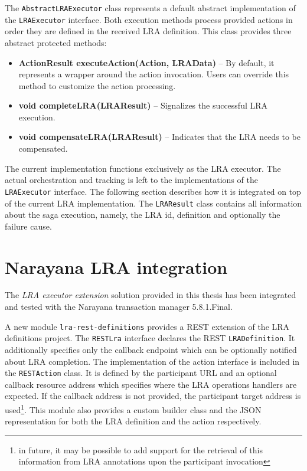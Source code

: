 \documentclass[oneside,
  digital, %
  table,   %
  lof,     %
  lot,     %
]{fithesis3}
\begin{document}
The \texttt{AbstractLRAExecutor} class represents a default abstract implementation of the \texttt{LRAExecutor} interface. Both execution methods process provided actions in order they are defined in the received LRA definition. This class provides three abstract protected methods:

\begin{itemize}
    \item \textbf{ActionResult executeAction(Action, LRAData)} -- By default, it represents a wrapper around the action invocation. Users can override this method to customize the action processing.
    
    \item \textbf{void completeLRA(LRAResult)} -- Signalizes the successful LRA execution.
    
    \item \textbf{void compensateLRA(LRAResult)} -- Indicates that the LRA needs to be compensated.
\end{itemize}

The current implementation functions exclusively as the LRA executor. The actual orchestration and tracking is left to the implementations of the \texttt{LRAExecutor} interface. The following section describes how it is integrated on top of the current LRA implementation. The \texttt{LRAResult} class contains all information about the saga execution, namely, the LRA id, definition and optionally the failure cause.

\section{Narayana LRA integration}
\label{sec:narayana-lra-integration}

The \textit{LRA executor extension} solution provided in this thesis has been integrated and tested with the Narayana transaction manager 5.8.1.Final. 

A new module \texttt{lra-rest-definitions} provides a REST extension of the LRA definitions project. The \texttt{RESTLra} interface declares the REST \texttt{LRADefinition}. It additionally specifies only the callback endpoint which can be optionally notified about LRA completion. The implementation of the action interface is included in the \texttt{RESTAction} class. It is defined by the participant URL and an optional callback resource address which specifies where the LRA operations handlers are expected. If the callback address is not provided, the participant target address is used\footnote{in future, it may be possible to add support for the retrieval of this information from LRA annotations upon the participant invocation}. This module also provides a custom builder class and the JSON representation for both the LRA definition and the action respectively.
\end{document}
